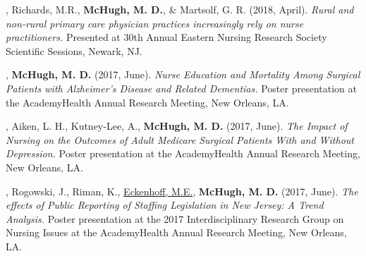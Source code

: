 \documentclass[10pt,]{article}
\begin{document}
{{{{{{{{{{{{{{\begin{hangparas}{.25in}{1}
\end{hangparas}

\vspace{4mm}

\begin{hangparas}{.25in}{1}

, Richards, M.R., {\textbf {McHugh, M. D.}}, \& Martsolf, G. R. (2018, April). {\textit {Rural and non-rural primary care physician practices increasingly rely on nurse practitioners.}} Presented at 30th Annual Eastern Nursing Research Society Scientific Sessions, Newark, NJ.

\end{hangparas}

\vspace{4mm}

\begin{hangparas}{.25in}{1}

, {\textbf {McHugh, M. D.}} (2017, June). {\textit {Nurse Education and Mortality Among Surgical Patients with Alzheimer’s Disease and Related Dementias.}} Poster presentation at the AcademyHealth Annual Research Meeting, New Orleans, LA.

\end{hangparas}

\vspace{4mm}

\begin{hangparas}{.25in}{1}

, Aiken, L. H., Kutney-Lee, A., {\textbf {McHugh, M. D.}} (2017, June). {\textit {The Impact of Nursing on the Outcomes of Adult Medicare Surgical Patients With and Without Depression.}} Poster presentation at the AcademyHealth Annual Research Meeting, New Orleans, LA.

\end{hangparas}

\vspace{4mm}

\begin{hangparas}{.25in}{1}

, Rogowski, J., Riman, K., {\underline {Eckenhoff, M.E.}}, {\textbf {McHugh, M. D.}} (2017, June). {\textit {The effects of Public Reporting of Staffing Legislation in New Jersey: A Trend Analysis.}} Poster presentation at the 2017 Interdisciplinary Research Group on Nursing Issues at the AcademyHealth Annual Research Meeting, New Orleans, LA.


\end{hangparas}}}}}}}}}}}}}}}
\end{document}
